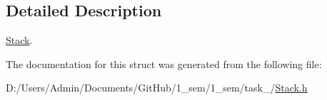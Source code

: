 \subsection{Detailed Description}
\mbox{\hyperlink{struct_stack}{Stack}}. 

The documentation for this struct was generated from the following file\+:\begin{DoxyCompactItemize}
\item 
D\+:/\+Users/\+Admin/\+Documents/\+Git\+Hub/1\+\_\+sem/1\+\_\+sem/task\+\_/\mbox{\hyperlink{_stack_8h}{Stack.\+h}}\end{DoxyCompactItemize}

